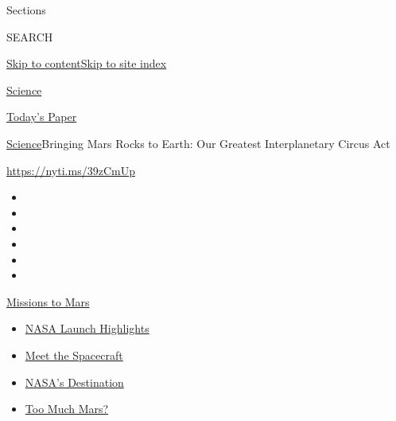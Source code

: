 Sections

SEARCH

\protect\hyperlink{site-content}{Skip to
content}\protect\hyperlink{site-index}{Skip to site index}

\href{https://www.nytimes3xbfgragh.onion/section/science}{Science}

\href{https://myaccount.nytimes3xbfgragh.onion/auth/login?response_type=cookie\&client_id=vi}{}

\href{https://www.nytimes3xbfgragh.onion/section/todayspaper}{Today's
Paper}

\href{/section/science}{Science}\textbar{}Bringing Mars Rocks to Earth:
Our Greatest Interplanetary Circus Act

\url{https://nyti.ms/39zCmUp}

\begin{itemize}
\item
\item
\item
\item
\item
\item
\end{itemize}

\href{https://www.nytimes3xbfgragh.onion/news-event/summer-of-mars?action=click\&pgtype=Article\&state=default\&region=TOP_BANNER\&context=storylines_menu}{Missions
to Mars}

\begin{itemize}
\tightlist
\item
  \href{https://www.nytimes3xbfgragh.onion/2020/07/30/science/nasa-mars-launch.html?action=click\&pgtype=Article\&state=default\&region=TOP_BANNER\&context=storylines_menu}{NASA
  Launch Highlights}
\item
  \href{https://www.nytimes3xbfgragh.onion/interactive/2020/science/mars-perseverance-tianwen-hope.html?action=click\&pgtype=Article\&state=default\&region=TOP_BANNER\&context=storylines_menu}{Meet
  the Spacecraft}
\item
  \href{https://www.nytimes3xbfgragh.onion/2020/07/28/science/nasa-jezero-perseverance.html?action=click\&pgtype=Article\&state=default\&region=TOP_BANNER\&context=storylines_menu}{NASA's
  Destination}
\item
  \href{https://www.nytimes3xbfgragh.onion/2020/07/28/science/mars-nasa-science.html?action=click\&pgtype=Article\&state=default\&region=TOP_BANNER\&context=storylines_menu}{Too
  Much Mars?}
\end{itemize}

